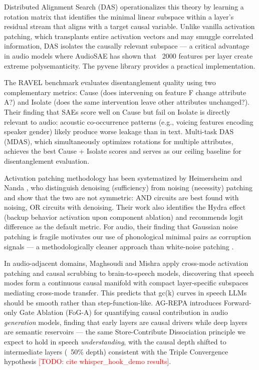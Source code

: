 \documentclass[a4paper]{article}
\begin{document}
Distributed Alignment Search (DAS) \cite{geiger2303} operationalizes this theory by learning a rotation matrix that identifies the minimal linear subspace within a layer's residual stream that aligns with a target causal variable. Unlike vanilla activation patching, which transplants entire activation vectors and may smuggle correlated information, DAS isolates the causally relevant subspace — a critical advantage in audio models where AudioSAE \cite{aparin2026} has shown that ~2000 features per layer create extreme polysemanticity. The pyvene library \cite{wu2024} provides a practical implementation.

The RAVEL benchmark \cite{huang2024} evaluates disentanglement quality using two complementary metrics: Cause (does intervening on feature F change attribute A?) and Isolate (does the same intervention leave other attributes unchanged?). Their finding that SAEs score well on Cause but fail on Isolate is directly relevant to audio: acoustic co-occurrence patterns (e.g., voicing features encoding speaker gender) likely produce worse leakage than in text. Multi-task DAS (MDAS), which simultaneously optimizes rotations for multiple attributes, achieves the best Cause + Isolate scores and serves as our ceiling baseline for disentanglement evaluation.

Activation patching methodology has been systematized by Heimersheim and Nanda \cite{ref2024}, who distinguish denoising (sufficiency) from noising (necessity) patching and show that the two are not symmetric: AND circuits are best found with noising, OR circuits with denoising. Their work also identifies the Hydra effect (backup behavior activation upon component ablation) and recommends logit difference as the default metric. For audio, their finding that Gaussian noise patching is fragile motivates our use of phonological minimal pairs as corruption signals — a methodologically cleaner approach than white-noise patching \cite{glazer2025}.

In audio-adjacent domains, Maghsoudi and Mishra \cite{arxiv_2602.01247} apply cross-mode activation patching and causal scrubbing to brain-to-speech models, discovering that speech modes form a continuous causal manifold with compact layer-specific subspaces mediating cross-mode transfer. This predicts that gc(k) curves in speech LLMs should be smooth rather than step-function-like. AG-REPA \cite{arxiv_2603.01006} introduces Forward-only Gate Ablation (FoG-A) for quantifying causal contribution in audio \textit{generation} models, finding that early layers are causal drivers while deep layers are semantic reservoirs — the same Store-Contribute Dissociation principle we expect to hold in speech \textit{understanding}, with the causal depth shifted to intermediate layers (~50\% depth) consistent with the Triple Convergence hypothesis \textcolor{red}{[TODO: cite whisper_hook_demo results]}.
\end{document}
